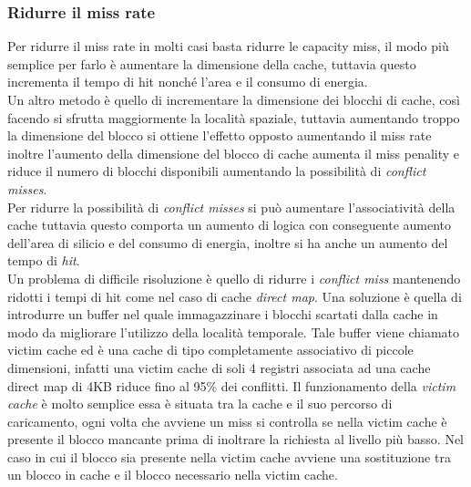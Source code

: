 \subsubsection{Ridurre il miss rate}
Per ridurre il miss rate in molti casi basta ridurre le capacity miss, il modo più semplice per farlo è aumentare la dimensione della cache, tuttavia questo incrementa il tempo di hit nonché l'area e il consumo di energia.\\
Un altro metodo è quello di incrementare la dimensione dei blocchi di cache, così facendo si sfrutta maggiormente la località spaziale, tuttavia aumentando troppo la dimensione del blocco si ottiene l'effetto opposto aumentando il miss rate inoltre l'aumento della dimensione del blocco di cache aumenta il miss penality e riduce il numero di blocchi disponibili aumentando la possibilità di \emph{conflict misses}.\\
Per ridurre la possibilità di \emph{conflict misses} si può aumentare l'associatività della cache tuttavia questo comporta un aumento di logica con conseguente aumento dell'area di silicio e del consumo di energia, inoltre si ha anche un aumento del tempo di \emph{hit}.\\
Un problema di difficile risoluzione è quello di ridurre i \emph{conflict miss} mantenendo ridotti i tempi di hit come nel caso di cache \emph{direct map}. Una soluzione è quella di introdurre un buffer nel quale immagazzinare i blocchi scartati dalla cache in modo da migliorare l'utilizzo della località temporale. Tale buffer viene chiamato victim cache ed è una cache di tipo completamente associativo di piccole dimensioni, infatti una victim cache di soli 4 registri associata ad una cache direct map di 4KB riduce fino al 95\% dei conflitti. Il funzionamento della \emph{victim cache} è molto semplice essa è situata tra la cache e il suo percorso di caricamento, ogni volta che avviene un miss si controlla se nella victim cache è presente il blocco mancante prima di inoltrare la richiesta al livello più basso. Nel caso in cui il blocco sia presente nella victim cache avviene una sostituzione tra un blocco in cache e il blocco necessario nella victim cache.\\
